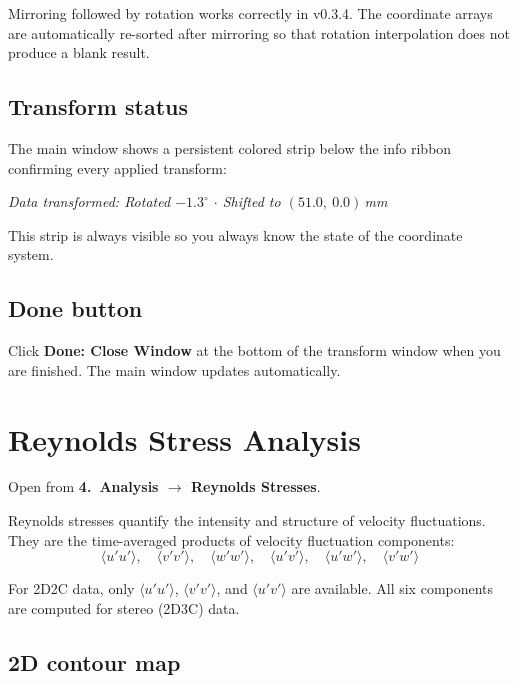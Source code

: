 \documentclass[11pt, a4paper]{report}
\newcommand{\uipth}[1]{\textbf{\textcolor{upblue}{#1}}}
\begin{document}
\begin{notebox}
Mirroring followed by rotation works correctly in v0.3.4. The coordinate arrays are automatically re-sorted after mirroring so that rotation interpolation does not produce a blank result.
\end{notebox}

\section{Transform status}

The main window shows a persistent colored strip below the info ribbon confirming every applied transform:

\begin{center}
\textit{Data transformed: Rotated $-1.3^\circ$ $\cdot$ Shifted to $(51.0,\ 0.0)$\,mm}
\end{center}

This strip is always visible so you always know the state of the coordinate system.

\section{Done button}

Click \uipth{Done: Close Window} at the bottom of the transform window when you are finished. The main window updates automatically.

\chapter{Reynolds Stress Analysis}
\label{ch:reynolds}

Open from \uipth{4.\ Analysis $\to$ Reynolds Stresses}.

Reynolds stresses quantify the intensity and structure of velocity fluctuations. They are the time-averaged products of velocity fluctuation components:
\[
\langle u'u' \rangle,\quad \langle v'v' \rangle,\quad \langle w'w' \rangle,\quad \langle u'v' \rangle,\quad \langle u'w' \rangle,\quad \langle v'w' \rangle
\]

For 2D2C data, only $\langle u'u' \rangle$, $\langle v'v' \rangle$, and $\langle u'v' \rangle$ are available. All six components are computed for stereo (2D3C) data.

\section{2D contour map}
\end{document}
